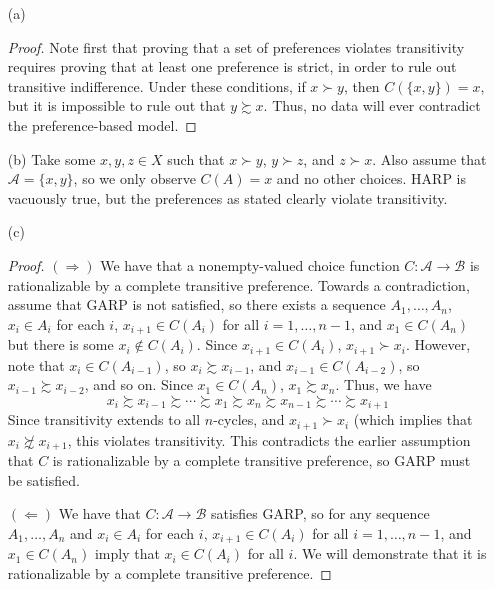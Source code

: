 \documentclass[12pt]{article}
\begin{document}
\begin{itemize}
    \item[(a)] \begin{proof} Note first that proving that a set of preferences violates transitivity requires proving that at least one preference is strict, in order to rule out transitive indifference. Under these conditions, if $x \succ y$, then $C(\{x,y\}) = x$, but it is impossible to rule out that $y \succsim x$. Thus, no data will ever contradict the preference-based model. \end{proof}

    \item[(b)] Take some $x,y,z \in X$ such that $x \succ y$, $y \succ z$, and $z \succ x$. Also assume that $\mathcal{A} = \{x,y\}$, so we only observe $C(A) = x$ and no other choices. HARP is vacuously true, but the preferences as stated clearly violate transitivity.  

    \item[(c)] 
    \begin{proof}
        $(\Longrightarrow)$ We have that a nonempty-valued choice function $C : \mathcal{A} \to \mathcal{B}$ is rationalizable by a complete transitive preference. Towards a contradiction, assume that GARP is not satisfied, so there exists a sequence $A_1,\dots,A_n$, $x_i \in A_i$ for each $i$, $x_{i+1} \in C(A_i)$ for all $i = 1,\dots,n-1$, and $x_1 \in C(A_n)$ but there is some $x_i \not\in C(A_i)$. Since $x_{i+1} \in C(A_i)$, $x_{i+1} \succ x_i$. However, note that $x_i \in C(A_{i-1})$, so $x_i \succsim x_{i-1}$, and $x_{i-1} \in C(A_{i-2})$, so $x_{i-1} \succsim x_{i-2}$, and so on. Since $x_1 \in C(A_n)$, $x_1 \succsim x_n$. Thus, we have
        \[
        x_i \succsim x_{i-1} \succsim \cdots \succsim x_1 \succsim x_n \succsim x_{n-1} \succsim \cdots \succsim x_{i+1}
        \]
        Since transitivity extends to all $n$-cycles, and $x_{i+1} \succ x_i$ (which implies that $x_i \not\succsim x_{i+1}$, this violates transitivity. This contradicts the earlier assumption that $C$ is rationalizable by a complete transitive preference, so GARP must be satisfied.

        \medskip

        $(\Longleftarrow)$ We have that $C: \mathcal{A} \to \mathcal{B}$ satisfies GARP, so for any sequence $A_1,\dots,A_n$ and $x_i \in A_i$ for each $i$, $x_{i+1} \in C(A_i)$ for all $i = 1,\dots,n-1$, and $x_1 \in C(A_n)$ imply that $x_i \in C(A_i)$ for all $i$. We will demonstrate that it is rationalizable by a complete transitive preference. 


\end{proof}
\end{itemize}
\end{document}
